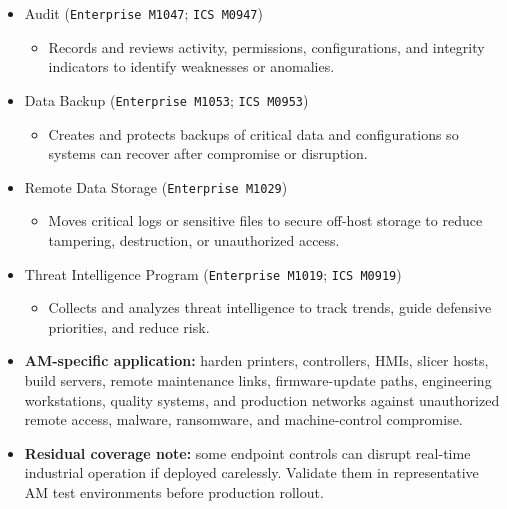 \documentclass[10pt,a4paper,oneside]{report}
\begin{document}
\begin{itemize}
\begin{itemize}
\begin{itemize}
\item Limits who can modify sensitive Windows registry keys or hives to reduce persistence, privilege escalation, or evasion.
\end{itemize}
\item Audit (\texttt{Enterprise M1047}; \texttt{ICS M0947})
\begin{itemize}
\item Records and reviews activity, permissions, configurations, and integrity indicators to identify weaknesses or anomalies.
\end{itemize}
\item Data Backup (\texttt{Enterprise M1053}; \texttt{ICS M0953})
\begin{itemize}
\item Creates and protects backups of critical data and configurations so systems can recover after compromise or disruption.
\end{itemize}
\item Remote Data Storage (\texttt{Enterprise M1029})
\begin{itemize}
\item Moves critical logs or sensitive files to secure off-host storage to reduce tampering, destruction, or unauthorized access.
\end{itemize}
\item Threat Intelligence Program (\texttt{Enterprise M1019}; \texttt{ICS M0919})
\begin{itemize}
\item Collects and analyzes threat intelligence to track trends, guide defensive priorities, and reduce risk.
\end{itemize}
\end{itemize}
\end{itemize}

\begin{itemize}
\item \textbf{AM-specific application:} harden printers, controllers, HMIs, slicer hosts, build servers, remote maintenance links, firmware-update paths, engineering workstations, quality systems, and production networks against unauthorized remote access, malware, ransomware, and machine-control compromise.
\end{itemize}

\begin{itemize}
\item \textbf{Residual coverage note:} some endpoint controls can disrupt real-time industrial operation if deployed carelessly. Validate them in representative AM test environments before production rollout.
\end{itemize}
\end{document}
